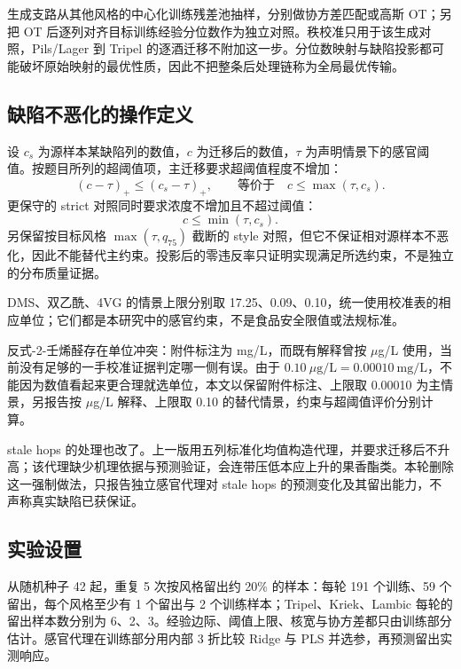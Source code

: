 \documentclass[UTF8,a4paper,zihao=-4]{ctexart}
\numberwithin{figure}{section}
\numberwithin{table}{section}
\numberwithin{equation}{section}
\begin{document}
生成支路从其他风格的中心化训练残差池抽样，分别做协方差匹配或高斯 OT；另把 OT 后逐列对齐目标训练经验分位数作为独立对照。秩校准只用于该生成对照，Pils/Lager 到 Tripel 的逐酒迁移不附加这一步。分位数映射与缺陷投影都可能破坏原始映射的最优性质，因此不把整条后处理链称为全局最优传输。

\subsection{缺陷不恶化的操作定义}

设 $c_s$ 为源样本某缺陷列的数值，$c$ 为迁移后的数值，$\tau$ 为声明情景下的感官阈值。按题目所列的超阈值项，主迁移要求超阈值程度不增加：
\begin{equation}
\left(c-\tau\right)_{+}\le\left(c_s-\tau\right)_{+},\qquad\text{等价于}\quad c\le\max\left(\tau,c_s\right).
\label{eq:defect-main}
\end{equation}
更保守的 strict 对照同时要求浓度不增加且不超过阈值：
\begin{equation}
c\le\min\left(\tau,c_s\right).
\label{eq:defect-strict}
\end{equation}
另保留按目标风格 $\max(\tau,q_{75})$ 截断的 style 对照，但它不保证相对源样本不恶化，因此不能替代主约束。投影后的零违反率只证明实现满足所选约束，不是独立的分布质量证据。

DMS、双乙酰、4VG 的情景上限分别取 17.25、0.09、0.10，统一使用校准表的相应单位；它们都是本研究中的感官约束，不是食品安全限值或法规标准。

反式-2-壬烯醛存在单位冲突：附件标注为 mg/L，而既有解释曾按 $\mu$g/L 使用，当前没有足够的一手校准证据判定哪一侧有误。由于 $0.10\ \mu\mathrm{g/L}=0.00010\ \mathrm{mg/L}$，不能因为数值看起来更合理就选单位，本文以保留附件标注、上限取 0.00010 为主情景，另报告按 $\mu$g/L 解释、上限取 0.10 的替代情景，约束与超阈值评价分别计算。

stale hops 的处理也改了。上一版用五列标准化均值构造代理，并要求迁移后不升高；该代理缺少机理依据与预测验证，会连带压低本应上升的果香酯类。本轮删除这一强制做法，只报告独立感官代理对 stale hops 的预测变化及其留出能力，不声称真实缺陷已获保证。

\subsection{实验设置}

从随机种子 42 起，重复 5 次按风格留出约 20\% 的样本：每轮 191 个训练、59 个留出，每个风格至少有 1 个留出与 2 个训练样本；Tripel、Kriek、Lambic 每轮的留出样本数分别为 6、2、3。经验边际、阈值上限、核宽与协方差都只由训练部分估计。感官代理在训练部分用内部 3 折比较 Ridge 与 PLS 并选参，再预测留出实测响应。
\end{document}
